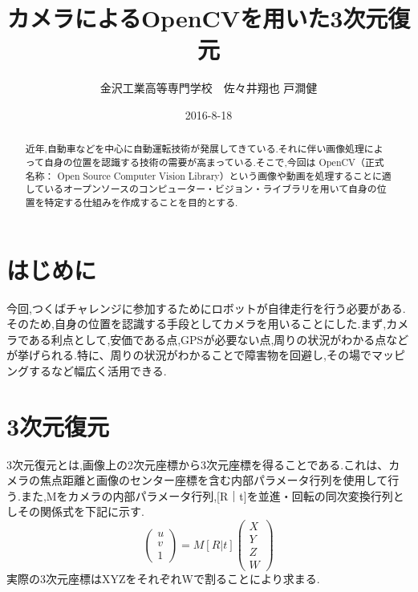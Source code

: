 \documentclass[11pt]{si2016}
\title{カメラによるOpenCVを用いた3次元復元}
\author{金沢工業高等専門学校　佐々井翔也 戸澗健}
\date{2016-8-18}
\begin{document}
\maketitle
\begin{abstract}
近年,自動車などを中心に自動運転技術が発展してきている.それに伴い画像処理によって自身の位置を認識する技術の需要が高まっている.そこで,今回は
OpenCV（正式名称： Open Source Computer Vision Library）という画像や動画を処理することに適しているオープンソースのコンピューター・ビジョン・ライブラリを用いて自身の位置を特定する仕組みを作成することを目的とする.
\end{abstract}

\tableofcontents
\section{はじめに}
今回,つくばチャレンジに参加するためにロボットが自律走行を行う必要がある.そのため,自身の位置を認識する手段としてカメラを用いることにした.まず,カメラである利点として,安価である点,GPSが必要ない点,周りの状況がわかる点などが挙げられる.特に、周りの状況がわかることで障害物を回避し,その場でマッピングするなど幅広く活用できる.



\section{3次元復元}
3次元復元とは,画像上の2次元座標から3次元座標を得ることである.これは、カメラの焦点距離と画像のセンター座標を含む内部パラメータ行列を使用して行う.また,Mをカメラの内部パラメータ行列,[R｜t]を並進・回転の同次変換行列としその関係式を下記に示す.
\begin{equation}
\left(
    \begin{array}{c}
      u \\
      v \\
      1 
    \end{array}
  \right)=M[R|t]\left(
    \begin{array}{c}
      X \\
      Y \\
      Z \\
      W
    \end{array}
  \right)
\end{equation}
実際の3次元座標はXYZをそれぞれWで割ることにより求まる.
\end{document}
